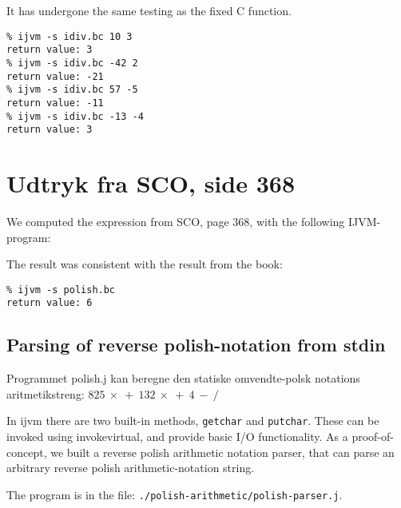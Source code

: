 \documentclass[12pt,a4paper]{article}
\begin{document}
\lstset{language=JVMIS}


It has undergone the same testing as the fixed C function.

\lstset{language=sh,numbers=none}
\begin{lstlisting}
% ijvm -s idiv.bc 10 3
return value: 3
% ijvm -s idiv.bc -42 2
return value: -21
% ijvm -s idiv.bc 57 -5
return value: -11
% ijvm -s idiv.bc -13 -4
return value: 3
\end{lstlisting}

\section{Udtryk fra SCO, side 368}
We computed the expression from SCO, page 368, with the following IJVM-program:
\lstset{language=JVMIS}


The result was consistent with the result from the book:
\lstset{language=sh,numbers=none}
\begin{lstlisting}
% ijvm -s polish.bc
return value: 6
\end{lstlisting}

\subsection{Parsing of reverse polish-notation from stdin}
Programmet polish.j kan beregne den statiske omvendte-polsk notations aritmetikstreng:
$825\ \times\ +\ 132\ \times\ +\ 4\ -\ /$

In ijvm there are two built-in methods, \texttt{getchar} and \texttt{putchar}. These can be invoked using invokevirtual, and provide basic I/O functionality.
As a proof-of-concept, we built a reverse polish arithmetic notation parser, that can parse an arbitrary reverse polish arithmetic-notation string.

The program is in the file: \texttt{./polish-arithmetic/polish-parser.j}.
\end{document}
